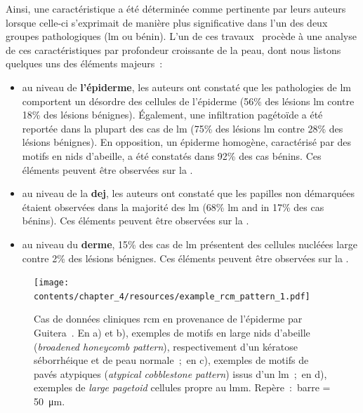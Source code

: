 Ainsi, une caractéristique a été déterminée comme pertinente par leurs auteurs lorsque celle-ci s'exprimait de manière plus significative dans l'un des deux groupes pathologiques (\gls{lm} ou bénin). L'un de ces travaux~\cite{Guitera2010} procède à une analyse de ces caractéristiques par profondeur croissante de la peau, dont nous listons quelques uns des éléments majeurs~:
\begin{itemize}
    \item au niveau de \textbf{l'épiderme}, les auteurs ont constaté que les pathologies de \gls{lm} comportent un désordre des cellules de l'épiderme (56\% des lésions \gls{lm} contre 18\% des lésions bénignes). Également, une infiltration pagétoïde a été reportée dans la plupart des cas de \gls{lm} (75\% des lésions \gls{lm} contre 28\% des lésions bénignes). En opposition, un épiderme homogène, caractérisé par des motifs en nids d'abeille, a été constatés dans 92\% des cas bénins. Ces éléments peuvent être observées sur la .
    \item au niveau de la \textbf{\gls{dej}}, les auteurs ont constaté que les papilles non démarquées étaient observées dans la majorité des \gls{lm} (68\% \gls{lm} and in 17\% des cas bénins). Ces éléments peuvent être observées sur la  .
    \item au niveau du \textbf{derme}, 15\% des cas de \gls{lm} présentent des cellules nucléées large contre 2\% des lésions bénignes. Ces éléments peuvent être observées sur la .
\end{itemize}\par

\begin{figure}[H]
    \begin{center}
        \texttt{[image: contents/chapter\_4/resources/example\_rcm\_pattern\_1.pdf]}
        \caption{Cas de données cliniques \gls{rcm} en provenance de l'épiderme par Guitera~\cite{Guitera2010}. En a) et b), exemples de motifs en large nids d'abeille (\textit{broadened honeycomb pattern}), respectivement d'un kératose séborrhéique et de peau normale~;~en c), exemples de motifs de pavés atypiques (\textit{atypical cobblestone pattern}) issus d'un \gls{lm}~;~en d), exemples de \textit{large pagetoid} cellules propre au \gls{lmm}. Repère~:~barre = \SI{50}{\micro\metre}.}
        \label{fig:example_rcm_pattern_1}
    \end{center} 
\end{figure}\par

